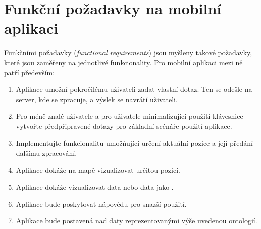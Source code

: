 \section{Funkční požadavky na mobilní aplikaci}
Funkčními požadavky (\textit{functional requirements}) jsou myšleny takové požadavky, které jsou zaměřeny na jednotlivé funkcionality. Pro mobilní aplikaci mezi ně patří především:

\begin{enumerate}
 \item Aplikace umožní pokročilému uživateli zadat vlastní  dotaz. Ten se odešle na server, kde se zpracuje, a výslek se navrátí uživateli.
 \item Pro méně znalé uživatele  a pro uživatele minimalizující použití klávesnice vytvořte předpřipravené dotazy pro základní scénáře použití aplikace.
 \item Implementujte funkcionalitu umožňující určení aktuální pozice a její předání dalšímu zpracování.
 \item Aplikace dokáže na mapě vizualizovat určitou pozici.
 \item Aplikace dokáže vizualizovat  data nebo data jako .
 \item Aplikace bude poskytovat nápovědu pro snazší použití.
 \item Aplikace bude postavená nad daty reprezentovanými výše uvedenou ontologií.
\end{enumerate}


